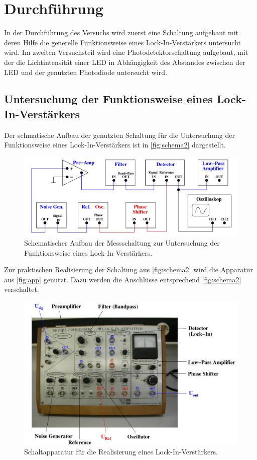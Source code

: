 \section{Durchführung}
\label{sec:Durchführung}
In der Durchführung des Versuchs wird zuerst eine Schaltung aufgebaut mit deren Hilfe die generelle Funktionsweise eines Lock-In-Verstärkers untersucht wird. Im zweiten Versuchsteil wird eine Photodetektorschaltung aufgebaut, mit der die Lichtintensität einer LED in Abhängigkeit des Abstandes zwischen  der LED und der genutzten Photodiode untersucht wird.
\subsection{Untersuchung der Funktionsweise eines Lock-In-Verstärkers}
Der schmatische Aufbau der genutzten Schaltung für die Untersuchung der Funktionsweise eines Lock-In-Verstärkers ist in \autoref{fig:schema2} dargestellt.
\begin{figure}[H]
    \centering
    \includegraphics{images/schema2.JPG}
    \caption{Schematischer Aufbau der Messschaltung zur Untersuchung der Funktionsweise eines Lock-In-Verstärkers. \cite{sample}}
    \label{fig:schema2}
\end{figure}
\noindent
Zur praktischen Realisierung der Schaltung aus \autoref{fig:schema2} wird die Apparatur aus \autoref{fig:app} genutzt. Dazu werden die Anschlüsse entsprechend \autoref{fig:schema2} verschaltet.
\begin{figure}[H]
    \centering
    \includegraphics{images/schaltung.JPG}
    \caption{Schaltapparatur für die Realisierung eines Lock-In-Verstärkers. \cite{sample}}
    \label{fig:app}
\end{figure}
